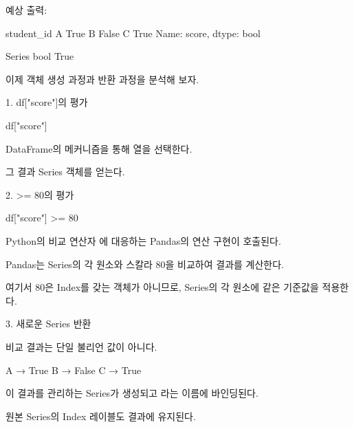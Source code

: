 예상 출력:

\begin{dhkzsh}
student_id
A     True
B    False
C     True
Name: score, dtype: bool

Series
bool
True
\end{dhkzsh}

이제 객체 생성 과정과 반환 과정을 분석해 보자.

\begin{dhknote}
\begin{dhksmry}[centered]
1. df["score"]의 평가
\end{dhksmry}
\end{dhknote}

\begin{dhkcode}
df["score"]
\end{dhkcode}

DataFrame의  메커니즘을 통해  열을 선택한다.

그 결과 Series 객체를 얻는다.

\begin{dhknote}
\begin{dhksmry}[centered]
2. >= 80의 평가
\end{dhksmry}
\end{dhknote}

\begin{dhkcode}
df["score"] >= 80
\end{dhkcode}

Python의 비교 연산자 \zsh{>=}에 대응하는 Pandas의 연산 구현이 호출된다.

Pandas는 Series의 각 원소와 스칼라 80을 비교하여 결과를 계산한다.

여기서 80은 Index를 갖는 객체가 아니므로, Series의 각 원소에 같은 기준값을 적용한다.

\begin{dhknote}
\begin{dhksmry}[centered]
3. 새로운 Series 반환
\end{dhksmry}
\end{dhknote}

비교 결과는 단일 불리언 값이 아니다.

\begin{dhkzsh}
A → True
B → False
C → True
\end{dhkzsh}

이 결과를 관리하는 Series가 생성되고 라는 이름에 바인딩된다.

원본 Series의 Index 레이블도 결과에 유지된다.

